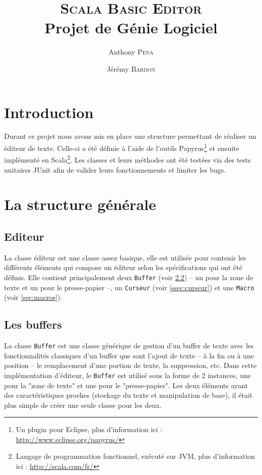 \documentclass[french]{article}
\author{Anthony \textsc{Pena} \and Jérémy \textsc{Bardon}}
\title{\textsc{Scala Basic Editor}\\\normalsize{Projet de Génie Logiciel}}
\date{}
\begin{document}
\maketitle

\vspace{3cm}

\renewcommand\contentsname{Sommaire}
\tableofcontents

\newpage

\section{Introduction}

Durant ce projet nous avons mis en place une structure permettant de réaliser un éditeur de texte. Celle-ci a été définie à l'aide de l'outils Papyrus\footnote{Un plugin pour Eclipse, plus d'information ici : \url{http://www.eclipse.org/papyrus/}} et ensuite implémenté en Scala\footnote{Langage de programmation fonctionnel, exécuté sur JVM, plus d'information ici : \url{http://scala.com/fr/}}. Les classes et leurs méthodes ont été testées via des tests unitaires JUnit afin de valider leurs fonctionnements et limiter les bugs.

\section{La structure générale}

\subsection{Editeur}\label{ssec:éditeur}
La classe éditeur est une classe assez basique, elle est utilisée pour contenir les différents éléments qui compose un éditeur selon les spécifications qui ont été définis. Elle contient principalement deux \texttt{Buffer} (voir \ref{ssec:buffers}) -- un pour la zone de texte et un pour le presse-papier --, un \texttt{Curseur} (voir \ref{ssec:curseur}) et une \texttt{Macro} (voir \ref{sec:macros}).

\subsection{Les buffers}\label{ssec:buffers}
La classe \texttt{Buffer} est une classe générique de gestion d'un buffer de texte avec les fonctionnalités classiques d'un buffer que sont l'ajout de texte -- à la fin ou à une position -- le remplacement d'une portion de texte, la suppression, etc. Dans cette implémentation d'éditeur, le \texttt{Buffer} est utilisé sous la forme de 2 instances, une pour la "zone de texte" et une pour le "presse-papier". Les deux éléments ayant des caractéristiques proches (stockage du texte et manipulation de base), il était plus simple de créer une seule classe pour les deux.
\end{document}
